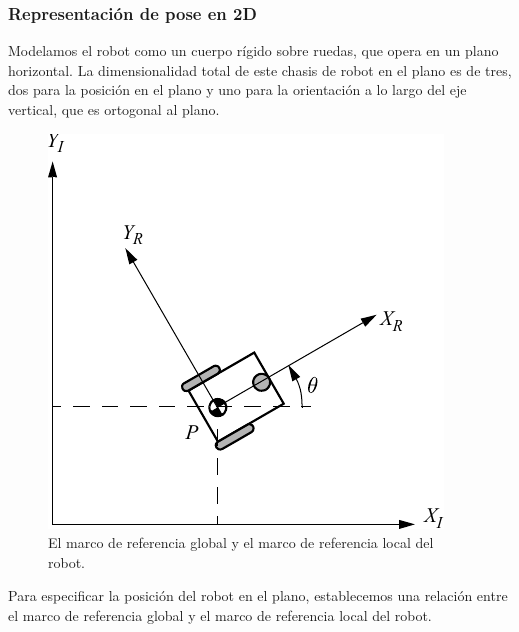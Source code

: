 \begin{frame}
    \frametitle{Representación de pose en 2D}
    \footnotesize
    Modelamos el robot como un cuerpo rígido sobre ruedas, que opera en un plano horizontal. La dimensionalidad total de este chasis de robot en el plano es de tres, dos para la posición en el plano y uno para la orientación a lo largo del eje vertical, que es ortogonal al plano.

    \begin{figure}[!h]
        \includegraphics[width=0.4\columnwidth]{./images/coordinate_systems.pdf}
        \caption{El marco de referencia global y el marco de referencia local del robot.}
    \end{figure}

    Para especificar la posición del robot en el plano, establecemos una relación entre el marco de referencia global y el marco de referencia local del robot.

\end{frame}


